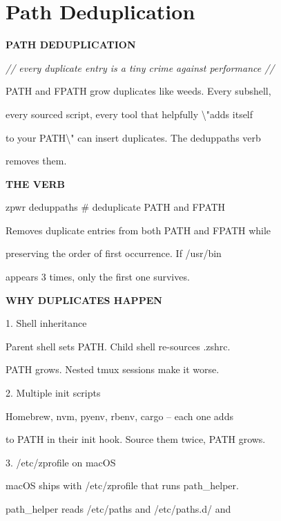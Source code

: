\documentclass[11pt,a4paper,twoside]{book}
\begin{document}
\section{Path Deduplication}


\vspace{10pt}
{\large\bfseries\color{neoncyan} PATH DEDUPLICATION}\vspace{6pt}

{\small\itshape\color{dimtext} // every duplicate entry is a tiny crime against performance //}

PATH and FPATH grow duplicates like weeds. Every subshell,

every sourced script, every tool that helpfully \textbackslash{}"adds itself

to your PATH\textbackslash{}" can insert duplicates. The deduppaths verb

removes them.


\vspace{12pt}
{\bfseries\color{neonyellow} THE VERB}\vspace{4pt}

\begin{codebox}
zpwr deduppaths                     \# deduplicate PATH and FPATH\\
\end{codebox}

Removes duplicate entries from both PATH and FPATH while

preserving the order of first occurrence. If /usr/bin

appears 3 times, only the first one survives.


\vspace{12pt}
{\bfseries\color{neonyellow} WHY DUPLICATES HAPPEN}\vspace{4pt}

1. Shell inheritance

Parent shell sets PATH. Child shell re-sources .zshrc.

PATH grows. Nested tmux sessions make it worse.

2. Multiple init scripts

Homebrew, nvm, pyenv, rbenv, cargo -- each one adds

to PATH in their init hook. Source them twice, PATH grows.

3. /etc/zprofile on macOS

macOS ships with /etc/zprofile that runs path\_helper.

path\_helper reads /etc/paths and /etc/paths.d/ and
\end{document}
